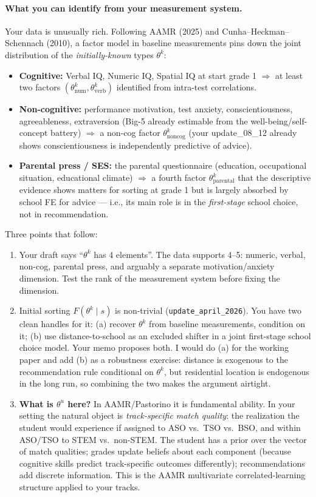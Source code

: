 \documentclass{article}
\begin{document}
\paragraph{What you can identify from your measurement system.}  Your data is
unusually rich. Following AAMR (2025) and Cunha--Heckman--Schennach (2010), a
factor model in baseline measurements pins down the joint distribution of the
\emph{initially-known} types $\theta^k$:
\begin{itemize}[leftmargin=*]
  \item \textbf{Cognitive:} Verbal IQ, Numeric IQ, Spatial IQ at start grade 1
  $\Rightarrow$ at least two factors $(\theta^k_{\text{num}},
  \theta^k_{\text{verb}})$ identified from intra-test correlations.
  \item \textbf{Non-cognitive:} performance motivation, test anxiety,
  conscientiousness, agreeableness, extraversion (Big-5 already estimable
  from the well-being/self-concept battery) $\Rightarrow$ a non-cog factor
  $\theta^k_{\text{noncog}}$ (your update\_08\_12 already shows
  conscientiousness is independently predictive of advice).
  \item \textbf{Parental press / SES:} the parental questionnaire (education,
  occupational situation, educational climate) $\Rightarrow$ a fourth factor
  $\theta^k_{\text{parental}}$ that the descriptive evidence shows matters
  for sorting at grade 1 but is largely absorbed by school FE for advice ---
  i.e., its main role is in the \emph{first-stage} school choice, not in
  recommendation.
\end{itemize}
Three points that follow:
\begin{enumerate}[leftmargin=*]
  \item Your draft says ``$\theta^k$ has 4 elements''. The data supports
  4--5: numeric, verbal, non-cog, parental press, and arguably a separate
  motivation/anxiety dimension. Test the rank of the measurement system before
  fixing the dimension.
  \item Initial sorting $F(\theta^k\mid s)$ is non-trivial
  (\texttt{update\_april\_2026}). You have two clean handles for it: (a)
  recover $\theta^k$ from baseline measurements, condition on it; (b) use
  distance-to-school as an excluded shifter in a joint first-stage school
  choice model. Your memo proposes both. I would do (a) for the working paper
  and add (b) as a robustness exercise: distance is exogenous to the
  recommendation rule conditional on $\theta^k$, but residential location is
  endogenous in the long run, so combining the two makes the argument
  airtight.
  \item \textbf{What is $\theta^u$ here?} In AAMR/Pastorino it is fundamental
  ability. In your setting the natural object is \emph{track-specific match
  quality}: the realization the student would experience if assigned to ASO
  vs.\ TSO vs.\ BSO, and within ASO/TSO to STEM vs.\ non-STEM. The student
  has a prior over the vector of match qualities; grades update beliefs
  about each component (because cognitive skills predict track-specific
  outcomes differently); recommendations add discrete information. This is
  the AAMR multivariate correlated-learning structure applied to your tracks.
\end{enumerate}
\end{document}
